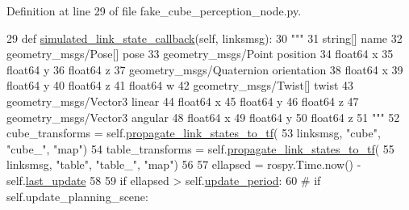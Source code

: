 Definition at line 29 of file fake\+\_\+cube\+\_\+perception\+\_\+node.\+py.


\begin{DoxyCode}
29     \textcolor{keyword}{def }\hyperlink{classfake__cube__perception__node_1_1FakePerceptionNode_ac1127eae8d2eda994b22873529bd198f}{simulated\_link\_state\_callback}(self, linksmsg):
30         \textcolor{stringliteral}{"""}
31 \textcolor{stringliteral}{        string[] name}
32 \textcolor{stringliteral}{        geometry\_msgs/Pose[] pose}
33 \textcolor{stringliteral}{          geometry\_msgs/Point position}
34 \textcolor{stringliteral}{            float64 x}
35 \textcolor{stringliteral}{            float64 y}
36 \textcolor{stringliteral}{            float64 z}
37 \textcolor{stringliteral}{          geometry\_msgs/Quaternion orientation}
38 \textcolor{stringliteral}{            float64 x}
39 \textcolor{stringliteral}{            float64 y}
40 \textcolor{stringliteral}{            float64 z}
41 \textcolor{stringliteral}{            float64 w}
42 \textcolor{stringliteral}{        geometry\_msgs/Twist[] twist}
43 \textcolor{stringliteral}{          geometry\_msgs/Vector3 linear}
44 \textcolor{stringliteral}{            float64 x}
45 \textcolor{stringliteral}{            float64 y}
46 \textcolor{stringliteral}{            float64 z}
47 \textcolor{stringliteral}{          geometry\_msgs/Vector3 angular}
48 \textcolor{stringliteral}{            float64 x}
49 \textcolor{stringliteral}{            float64 y}
50 \textcolor{stringliteral}{            float64 z}
51 \textcolor{stringliteral}{        """}
52         cube\_transforms = self.\hyperlink{classfake__cube__perception__node_1_1FakePerceptionNode_aeac788f768e625ecbe445c6af105d3f8}{propagate\_link\_states\_to\_tf}(
53             linksmsg, \textcolor{stringliteral}{"cube"}, \textcolor{stringliteral}{"cube\_"}, \textcolor{stringliteral}{"map"})
54         table\_transforms = self.\hyperlink{classfake__cube__perception__node_1_1FakePerceptionNode_aeac788f768e625ecbe445c6af105d3f8}{propagate\_link\_states\_to\_tf}(
55             linksmsg, \textcolor{stringliteral}{"table"}, \textcolor{stringliteral}{"table\_"}, \textcolor{stringliteral}{"map"})
56 
57         ellapsed = rospy.Time.now() - self.\hyperlink{classfake__cube__perception__node_1_1FakePerceptionNode_a2f5f0b4e0a1483187b2a84552df7edc1}{last\_update}
58 
59         \textcolor{keywordflow}{if} ellapsed > self.\hyperlink{classfake__cube__perception__node_1_1FakePerceptionNode_a3df1532cfe1c0b4ed99346a498150c73}{update\_period}:
60             \textcolor{comment}{# if self.update\_planning\_scene:}

\end{DoxyCode}
